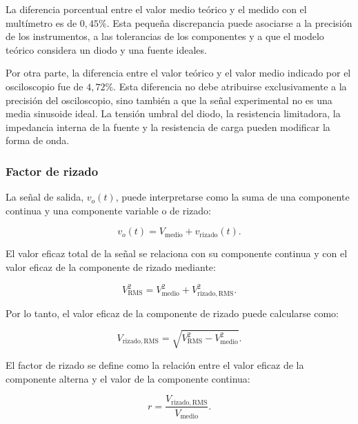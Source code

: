 La diferencia porcentual entre el valor medio teórico y el medido con el multímetro es de $0{,}45\%$. Esta pequeña discrepancia puede asociarse a la precisión de los instrumentos, a las tolerancias de los componentes y a que el modelo teórico considera un diodo y una fuente ideales.

Por otra parte, la diferencia entre el valor teórico y el valor medio indicado por el osciloscopio fue de $4{,}72\%$. Esta diferencia no debe atribuirse exclusivamente a la precisión del osciloscopio, sino también a que la señal experimental no es una media sinusoide ideal. La tensión umbral del diodo, la resistencia limitadora, la impedancia interna de la fuente y la resistencia de carga pueden modificar la forma de onda.


\subsubsection{Factor de rizado}

La señal de salida, $v_o(t)$, puede interpretarse como la suma de una componente continua y una componente variable o de rizado:

\begin{equation}
    v_o(t)
    =
    V_{\mathrm{medio}}
    +
    v_{\mathrm{rizado}}(t).
\end{equation}

El valor eficaz total de la señal se relaciona con su componente continua y con el valor eficaz de la componente de rizado mediante:

\begin{equation}
    V_{\mathrm{RMS}}^2
    =
    V_{\mathrm{medio}}^2
    +
    V_{\mathrm{rizado,RMS}}^2.
\end{equation}

Por lo tanto, el valor eficaz de la componente de rizado puede calcularse como:

\begin{equation}
    V_{\mathrm{rizado,RMS}}
    =
    \sqrt{
        V_{\mathrm{RMS}}^2
        -
        V_{\mathrm{medio}}^2
    }.
\end{equation}

El factor de rizado se define como la relación entre el valor eficaz de la componente alterna y el valor de la componente continua:

\begin{equation}
    r
    =
    \frac{
        V_{\mathrm{rizado,RMS}}
    }{
        V_{\mathrm{medio}}
    }.
\end{equation}

